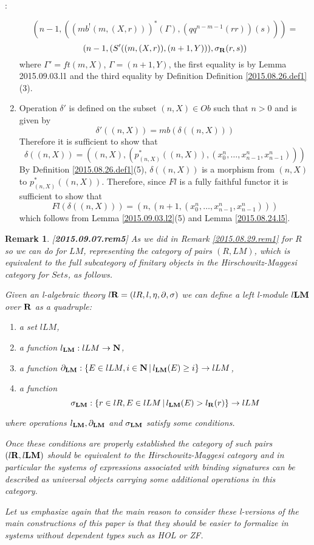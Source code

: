 \documentclass[11pt]{article}
\newenvironment{proof}{{\bf Proof}:}{\vskip 5mm }
\newtheorem{remark}[proposition]{Remark}
\newcommand{\llabel}[1]{\label{#1}[{\bf #1}]}
\newcommand{\sr}{\rightarrow}
\newcommand{\nn}{{\bf N\rm}}
\newcommand{\nat}{\nn}
\newcommand{\rr}{{\bf R}}
\newcommand{\lm}{{\bf LM}}
\begin{document}
\begin{proof}
\begin{enumerate}
$$(n-1,((mb^!(m,(X,r)))^*(\Gamma),(qq^{n-m-1}(rr))(s)))=$$
$$(n-1,(S'((m,(X,r)),(n+1,Y))),\sigma_{\rr}(r,s))$$
%
where $\Gamma'=ft(m,X)$, $\Gamma=(n+1,Y)$, the first equality is by Lemma {2015.09.03.l1} and the third equality by Definition Definition \ref{2015.08.26.def1}(3). 
\item Operation $\delta'$ is defined on the subset $(n,X)\in Ob$ such that $n>0$ and is given by
%
$$\delta'((n,X))=mb(\delta((n,X)))$$
%
Therefore it is sufficient to show that
%
$$\delta((n,X))=((n,X),(p_{(n,X)}^*((n,X)),(x_0^n,\dots,x_{n-1}^n,x_{n-1}^n)))$$
%
By Definition \ref{2015.08.26.def1}(5), $\delta((n,X))$ is a morphism from $(n,X)$ to $p_{(n,X)}^*((n,X))$. Therefore, since $Fl$ is a fully faithful functor it is sufficient to show that 
%
$$Fl(\delta((n,X)))=(n,(n+1,(x_0^n,\dots,x_{n-1}^n,x_{n-1}^n)))$$
%
which follows from Lemma \ref{2015.09.03.l2}(5) and Lemma \ref{2015.08.24.l5}.
%
\end{enumerate}
\end{proof}
%
\begin{remark}\rm
\llabel{2015.09.07.rem5}
As we did in Remark \ref{2015.08.29.rem1} for $R$ so we can do for $LM$, representing the category of pairs $(R,LM)$, which is equivalent to the full subcategory of finitary objects in the Hirschowitz-Maggesi category for $Sets$, as follows.

Given an l-algebraic theory $l\rr=(lR,l,\eta,\partial,\sigma)$ we can define a left l-module $l\lm$ over $\rr$ as a quadruple:
%
\begin{enumerate}
\item a set $lLM$,
\item a function $l_{\lm}:lLM\sr \nn$,
\item a function $\partial_{\lm}:\{E\in lLM, i\in\nat\,|\, l_{\lm}(E)\ge i\}\sr lLM$,
\item a function 
%
$$\sigma_{\lm}:\{r\in lR,E\in lLM\,|\,l_{\lm}(E)>l_{\rr}(r)\}\sr lLM$$
%
\end{enumerate}
%
where operations $l_{\lm},\partial_{\lm}$ and $\sigma_{\lm}$ satisfy some conditions. 

Once these conditions are properly established the category of such pairs $(l\rr,l\lm)$ should be equivalent to the Hirschowitz-Maggesi category and in particular the systems of expressions associated with binding signatures can be described as universal objects carrying some additional operations in this category. 

Let us emphasize again that the main reason to consider these l-versions of the main constructions of this paper is that they should be easier to formalize in systems without dependent types such as HOL or ZF. 
\end{remark} 
%
\end{document}
